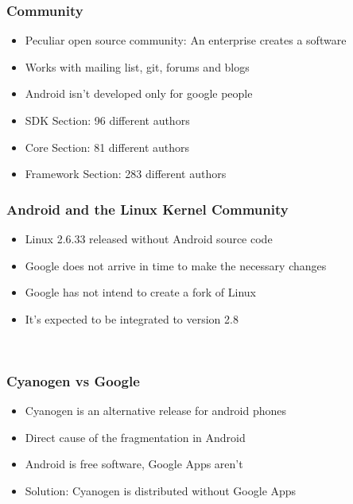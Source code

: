 \documentclass{beamer}
\begin{document}
\begin{frame}
\frametitle{Community}

\begin{itemize}
\item Peculiar open source community: An enterprise creates a
  software
\item Works with mailing list, git, forums and blogs
\item Android isn't developed only for google people
\item SDK Section: 96 different authors
\item Core Section: 81 different authors
\item Framework Section: 283 different authors

\end{itemize}
\end{frame}

\begin{frame}
\frametitle{Android and the Linux Kernel Community}
\begin{itemize}
\item Linux 2.6.33 released without Android source code
\item Google does not arrive in time to make the necessary changes
\item Google has not intend to create a fork of Linux
\item It's expected to be integrated to version 2.8
\end{itemize}

\begin{center}
 \\
\end{center}
\end{frame}

\begin{frame}
\frametitle{Cyanogen vs Google}
\begin{itemize}
\item Cyanogen is an alternative release for android phones
\item Direct cause of the fragmentation in Android
\item Android is free software, Google Apps aren't
\item Solution: Cyanogen is distributed without Google Apps
\end{itemize}

\begin{center}
 \\
\end{center}
\end{frame}
\end{document}
